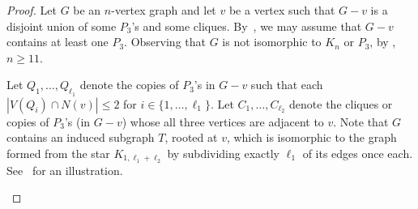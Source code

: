 \documentclass[a4paper,12pt]{article}
\theoremstyle{plain}
\begin{document}
\begin{proof}
Let $G$ be an $n$-vertex graph and let $v$ be a vertex such that $G-v$ is a disjoint union of some $P_3$'s and some cliques. By~, we may assume that $G-v$ contains at least one $P_3$.
Observing that $G$ is not isomorphic to $K_n$ or $P_3$, by , $n \geq 11$. 

Let $Q_1, \ldots, Q_{\ell_1}$ denote the copies of $P_3$'s in $G-v$ such that each $|V(Q_i)\cap N(v)|\leq 2$ for $i\in \{1,\ldots, \ell_1\}$. 
Let $C_1, \ldots, C_{\ell_2}$ denote the cliques or copies of $P_3$'s (in $G-v$) whose all three vertices are adjacent to $v$. Note that $G$ contains an induced subgraph $T$, rooted at $v$, which is isomorphic to the graph formed from the star $K_{1,\ell_1+\ell_2}$ by subdividing exactly $\ell_1$ of its edges once each. See~ for an illustration. 
\begin{figure}[ht]
\centering
{}
\end{figure}
\end{proof}
\end{document}
